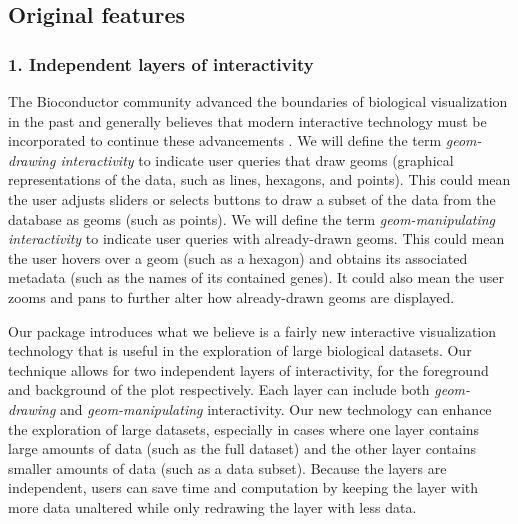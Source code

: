 \documentclass[parskip=full]{bmcart} %
\begin{document}
\subsection*{Original features}

\subsubsection*{1. Independent layers of interactivity}

The Bioconductor community advanced the boundaries of biological visualization in the past and generally believes that modern interactive technology must be incorporated to continue these advancements \cite{gentleman2004bioconductor}. We will define the term \textit{geom-drawing interactivity} to indicate user queries that draw geoms (graphical representations of the data, such as lines, hexagons, and points). This could mean the user adjusts sliders or selects buttons to draw a subset of the data from the database as geoms (such as points). We will define the term \textit{geom-manipulating interactivity} to indicate user queries with already-drawn geoms. This could mean the user hovers over a geom (such as a hexagon) and obtains its associated metadata (such as the names of its contained genes). It could also mean the user zooms and pans to further alter how already-drawn geoms are displayed.

Our package introduces what we believe is a fairly new interactive visualization technology that is useful in the exploration of large biological datasets. Our technique allows for two independent layers of interactivity, for the foreground and background of the plot respectively. Each layer can include both \textit{geom-drawing} and \textit{geom-manipulating} interactivity. Our new technology can enhance the exploration of large datasets, especially in cases where one layer contains large amounts of data (such as the full dataset) and the other layer contains smaller amounts of data (such as a data subset). Because the layers are independent, users can save time and computation by keeping the layer with more data unaltered while only redrawing the layer with less data.
\end{document}
